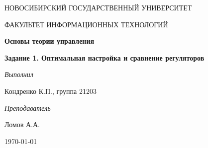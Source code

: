 \begin{titlepage}
	\centering
	{\LARGE \textsc{НОВОСИБИРСКИЙ ГОСУДАРСТВЕННЫЙ УНИВЕРСИТЕТ}\par}
	{\textsc{ФАКУЛЬТЕТ ИНФОРМАЦИОННЫХ ТЕХНОЛОГИЙ}\par}
	
	\vspace{3cm}
	
	{\huge\bfseries Основы теории управления\par}
	
	\vspace{1cm}
	
	{\Large\bfseries Задание 1. Оптимальная настройка и сравнение регуляторов\par}
	
	\vspace{10cm}
	
	\begin{flushright}
		{\large\textit{Выполнил}}
		
		Кондренко К.П., группа 21203
		
		\bigskip
		
		{\large\textit{Преподаватель}}
		
		Ломов А.А.
	\end{flushright}
	
	\vfill
	
	{\large \today\par}
\end{titlepage}
